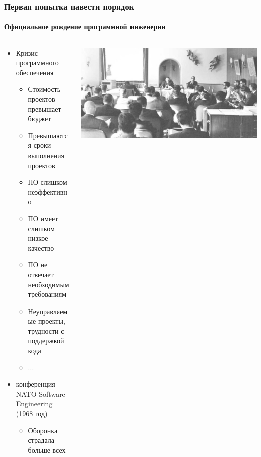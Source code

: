 \documentclass{../../slides-style}
\begin{document}
    \begin{frame}
        \frametitle{Первая попытка навести порядок}
        \framesubtitle{Официальное рождение программной инженерии}
        \begin{columns}
            \begin{column}{0.7\textwidth}
                \begin{itemize}
                    \item Кризис программного обеспечения
                    \begin{itemize}
                        \item Стоимость проектов превышает бюджет
                        \item Превышаются сроки выполнения проектов
                        \item ПО слишком неэффективно
                        \item ПО имеет слишком низкое качество
                        \item ПО не отвечает необходимым требованиям
                        \item Неуправляемые проекты, трудности с поддержкой кода
                        \item ...
                    \end{itemize}
                    \item конференция NATO Software Engineering (1968 год)
                    \begin{itemize}
                        \item Оборонка страдала больше всех
                    \end{itemize}
                \end{itemize}
            \end{column}
            \begin{column}{0.3\textwidth}
                \begin{center}
                    \includegraphics[width=\textwidth]{natoConference.png}
                \end{center}
            \end{column}
        \end{columns}
    \end{frame}
\end{document}
